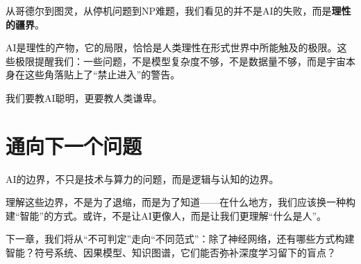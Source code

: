 从哥德尔到图灵，从停机问题到NP难题，我们看见的并不是AI的失败，而是\textbf{理性的疆界}。

AI是理性的产物，它的局限，恰恰是人类理性在形式世界中所能触及的极限。这些极限提醒我们：一些问题，不是模型复杂度不够，不是数据量不够，而是宇宙本身在这些角落贴上了“禁止进入”的警告。

我们要教AI聪明，更要教人类谦卑。

\section*{通向下一个问题}

AI的边界，不只是技术与算力的问题，而是逻辑与认知的边界。

理解这些边界，不是为了退缩，而是为了知道——在什么地方，我们应该换一种构建“智能”的方式。或许，不是让AI更像人，而是让我们更理解“什么是人”。

下一章，我们将从“不可判定”走向“不同范式”：除了神经网络，还有哪些方式构建智能？符号系统、因果模型、知识图谱，它们能否弥补深度学习留下的盲点？

\nocite{*}
\printbibliography[heading=bibintoc, title=\ebibname]
\appendix

\newpage
